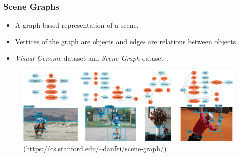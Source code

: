 \documentclass{beamer}
\begin{document}
\begin{frame}
    \frametitle{Scene Graphs}
    \begin{itemize}
        \item A graph-based representation of a scene.
        \item Vertices of the graph are objects and edges are relations between objects.
        \item \emph{Visual Genome} dataset \citep{krishnavisualgenome} and \emph{Scene Graph} dataset \citep{xu2017scenegraph}.
    \end{itemize}
    \begin{figure}[ht]
        \centering
        \includegraphics[width=\textwidth]{figures/scene_graph.jpeg}
        \caption*{\hfill \color{gray}(\url{https://cs.stanford.edu/~danfei/scene-graph/})}
    \end{figure}
\end{frame}
\end{document}
